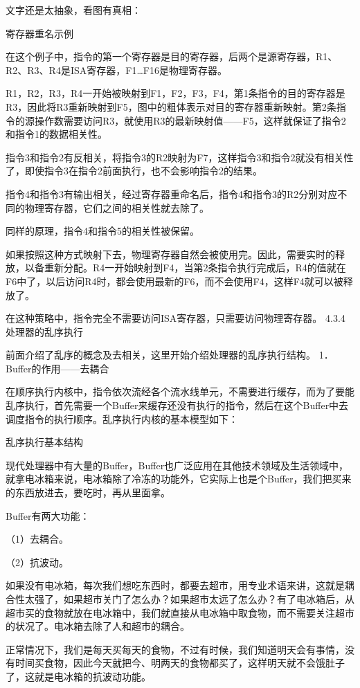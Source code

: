 \documentclass[12pt,UTF8]{ctexbook}
\begin{document}
文字还是太抽象，看图有真相：

寄存器重名示例

在这个例子中，指令的第一个寄存器是目的寄存器，后两个是源寄存器，R1、R2、R3、R4是ISA寄存器，F1…F16是物理寄存器。

R1，R2，R3，R4一开始被映射到F1，F2，F3，F4，第1条指令的目的寄存器是R3，因此将R3重新映射到F5，图中的粗体表示对目的寄存器重新映射。第2条指令的源操作数需要访问R3，就使用R3的最新映射值——F5，这样就保证了指令2和指令1的数据相关性。

指令3和指令2有反相关，将指令3的R2映射为F7，这样指令3和指令2就没有相关性了，即使指令3在指令2前面执行，也不会影响指令2的结果。

指令4和指令3有输出相关，经过寄存器重命名后，指令4和指令3的R2分别对应不同的物理寄存器，它们之间的相关性就去除了。

同样的原理，指令4和指令5的相关性被保留。

如果按照这种方式映射下去，物理寄存器自然会被使用完。因此，需要实时的释放，以备重新分配。R4一开始映射到F4，当第2条指令执行完成后，R4的值就在F6中了，以后访问R4时，都会使用最新的F6，而不会使用F4，这样F4就可以被释放了。

在这种策略中，指令完全不需要访问ISA寄存器，只需要访问物理寄存器。
4.3.4　处理器的乱序执行

前面介绍了乱序的概念及去相关，这里开始介绍处理器的乱序执行结构。
1．Buffer的作用——去耦合

在顺序执行内核中，指令依次流经各个流水线单元，不需要进行缓存，而为了要能乱序执行，首先需要一个Buffer来缓存还没有执行的指令，然后在这个Buffer中去调度指令的执行顺序。乱序执行内核的基本模型如下：

乱序执行基本结构

现代处理器中有大量的Buffer，Buffer也广泛应用在其他技术领域及生活领域中，就拿电冰箱来说，电冰箱除了冷冻的功能外，它实际上也是个Buffer，我们把买来的东西放进去，要吃时，再从里面拿。

Buffer有两大功能：

（1）去耦合。

（2）抗波动。

如果没有电冰箱，每次我们想吃东西时，都要去超市，用专业术语来讲，这就是耦合性太强了，如果超市关门了怎么办？如果超市太远了怎么办？有了电冰箱后，从超市买的食物就放在电冰箱中，我们就直接从电冰箱中取食物，而不需要关注超市的状况了。电冰箱去除了人和超市的耦合。

正常情况下，我们是每天买每天的食物，不过有时候，我们知道明天会有事情，没有时间买食物，因此今天就把今、明两天的食物都买了，这样明天就不会饿肚子了，这就是电冰箱的抗波动功能。
\end{document}
